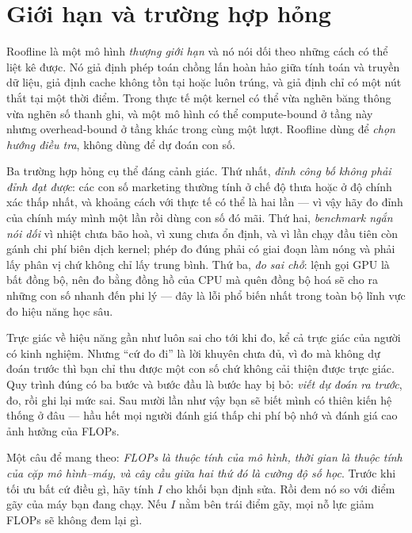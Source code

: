 \documentclass[../../deep_learning.tex]{subfiles}
\begin{document}
\section{Giới hạn và trường hợp hỏng}

Roofline là một mô hình \emph{thượng giới hạn} và nó nói dối theo những cách có thể liệt kê được. Nó giả định phép toán chồng lấn hoàn hảo giữa tính toán và truyền dữ liệu, giả định cache không tồn tại hoặc luôn trúng, và giả định chỉ có một nút thắt tại một thời điểm. Trong thực tế một kernel có thể vừa nghẽn băng thông vừa nghẽn số thanh ghi, và một mô hình có thể compute-bound ở tầng này nhưng overhead-bound ở tầng khác trong cùng một lượt. Roofline dùng để \emph{chọn hướng điều tra}, không dùng để dự đoán con số.

Ba trường hợp hỏng cụ thể đáng cảnh giác. Thứ nhất, \emph{đỉnh công bố không phải đỉnh đạt được}: các con số marketing thường tính ở chế độ thưa hoặc ở độ chính xác thấp nhất, và khoảng cách với thực tế có thể là hai lần --- vì vậy hãy đo đỉnh của chính máy mình một lần rồi dùng con số đó mãi. Thứ hai, \emph{benchmark ngắn nói dối} vì nhiệt chưa bão hoà, vì xung chưa ổn định, và vì lần chạy đầu tiên còn gánh chi phí biên dịch kernel; phép đo đúng phải có giai đoạn làm nóng và phải lấy phân vị chứ không chỉ lấy trung bình. Thứ ba, \emph{đo sai chỗ}: lệnh gọi GPU là bất đồng bộ, nên đo bằng đồng hồ của CPU mà quên đồng bộ hoá sẽ cho ra những con số nhanh đến phi lý --- đây là lỗi phổ biến nhất trong toàn bộ lĩnh vực đo hiệu năng học sâu.

\begin{cambay}
Trực giác về hiệu năng gần như luôn sai cho tới khi đo, kể cả trực giác của người có kinh nghiệm. Nhưng ``cứ đo đi'' là lời khuyên chưa đủ, vì đo mà không dự đoán trước thì bạn chỉ thu được một con số chứ không cải thiện được trực giác. Quy trình đúng có ba bước và bước đầu là bước hay bị bỏ: \emph{viết dự đoán ra trước}, đo, rồi ghi lại mức sai. Sau mười lần như vậy bạn sẽ biết mình có thiên kiến hệ thống ở đâu --- hầu hết mọi người đánh giá thấp chi phí bộ nhớ và đánh giá cao ảnh hưởng của FLOPs.
\end{cambay}

\begin{cannho}
Một câu để mang theo: \emph{FLOPs là thuộc tính của mô hình, thời gian là thuộc tính của cặp mô hình--máy, và cây cầu giữa hai thứ đó là cường độ số học}. Trước khi tối ưu bất cứ điều gì, hãy tính \(I\) cho khối bạn định sửa. Rồi đem nó so với điểm gãy của máy bạn đang chạy. Nếu \(I\) nằm bên trái điểm gãy, mọi nỗ lực giảm FLOPs sẽ không đem lại gì. 
\end{cannho}
\end{document}
